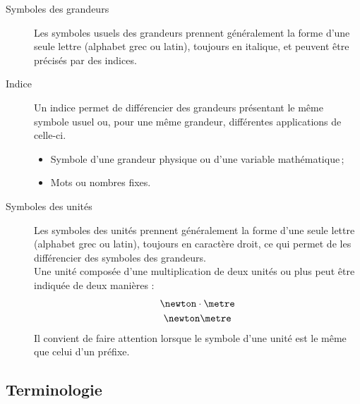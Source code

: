 \documentclass[a4paper, 11pt, twoside, fleqn]{memoir}
\begin{document}
\begin{description}
	\item[Symboles des grandeurs] Les symboles usuels des grandeurs prennent généralement la forme d'une seule lettre (alphabet grec ou latin), toujours en italique, et peuvent être précisés par des indices.
	\item [Indice] Un indice permet de différencier des grandeurs présentant le même symbole usuel ou, pour une même grandeur, différentes applications de celle-ci.
		\begin{itemize}
			\item Symbole d'une grandeur physique ou d'une variable mathématique\,;
			\item Mots ou nombres fixes.
		\end{itemize}
	\item[Symboles des unités] Les symboles des unités prennent généralement la forme d'une seule lettre (alphabet grec ou latin), toujours en caractère droit, ce qui permet de les différencier des symboles des grandeurs.\\
Une unité composée d'une multiplication de deux unités ou plus peut être indiquée de deux manières :
		\begin{gather*}
			\newton\cdot\metre \\ 
			\newton\metre
		\end{gather*}
Il convient de faire attention lorsque le symbole d'une unité est le même que celui d'un préfixe.
\end{description}

\subsection{Terminologie}
\end{document}
